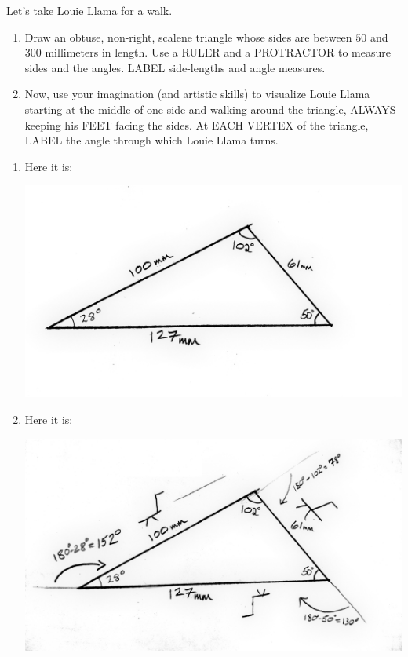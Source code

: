 \documentclass[nooutcomes,noauthor,handout,12pt]{ximera}
\begin{document}
\begin{question}
  Let's take Louie Llama for a walk.
  \begin{enumerate}
  \item Draw an obtuse, non-right, scalene triangle whose sides are
    between $50$ and $300$ millimeters in length. Use a RULER and a
    PROTRACTOR to measure sides and the angles. LABEL side-lengths and
    angle measures.
  \item Now, use your imagination (and artistic skills) to visualize
    Louie Llama starting at the middle of one side and walking around
    the triangle, ALWAYS keeping his FEET facing the sides. At EACH
    VERTEX of the triangle, LABEL the angle through which Louie Llama
    turns.
  \end{enumerate}
  \begin{freeResponse}
    \begin{enumerate}
    \item Here it is:
      \begin{center}
        \includegraphics[width=.4\textwidth]{specificTri.jpg}
      \end{center}
    \item Here it is:
      \begin{center}
        \includegraphics[width=.4\textwidth]{llamaAndSpecificTri.jpg}
      \end{center}
      
    \end{enumerate}
  \end{freeResponse}
\end{question}
\end{document}
